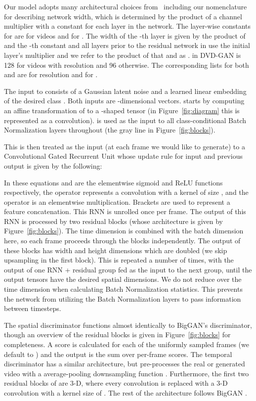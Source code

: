 \documentclass{article} \usepackage{iclr2020_conference,times}
\begin{document}
Our model adopts many architectural choices from~\citet{brock2018large} including our nomenclature for describing network width, which is determined by the product of a channel multiplier  with a constant for each layer in the network. The layer-wise constants for  are  for  videos and  for . The width of the -th layer is given by the product of  and the -th constant and all layers prior to the residual network in  use the initial layer's multiplier and we refer to the product of that and  as .  in DVD-GAN is 128 for videos with  resolution and 96 otherwise. The corresponding  lists for both  and  are  for  resolution and  for .

The input to  consists of a Gaussian latent noise  and a learned linear embedding  of the desired class . Both inputs are -dimensional vectors.  starts by computing an affine transformation of  to a -shaped tensor (in Figure~\ref{fig:diagram} this is represented as a  convolution).  is used as the input to all class-conditional Batch Normalization layers throughout  (the gray line in Figure~\ref{fig:blocks}).

This is then treated as the input (at each frame we would like to generate) to a Convolutional Gated Recurrent Unit \citep{ballas2015delving, sutskever2011generating} whose update rule for input  and previous output  is given by the following:



In these equations  and  are the elementwise sigmoid and ReLU functions respectively, the  operator represents a convolution with a kernel of size , and the  operator is an elementwise multiplication. Brackets are used to represent a feature concatenation. This RNN is unrolled once per frame. The output of this RNN is processed by two residual blocks (whose architecture is given by Figure~\ref{fig:blocks}). The time dimension is combined with the batch dimension here, so each frame proceeds through the blocks independently. The output of these blocks has width and height dimensions which are doubled (we skip upsampling in the first block). This is repeated a number of times, with the output of one RNN + residual group fed as the input to the next group, until the output tensors have the desired spatial dimensions.
We do not reduce over the time dimension when calculating Batch Normalization statistics. This prevents the network from utilizing the Batch Normalization layers to pass information between timesteps.

The spatial discriminator  functions almost identically to BigGAN's discriminator, though an overview of the residual blocks is given in Figure~\ref{fig:blocks} for completeness. A score is calculated for each of the uniformly sampled  frames (we default to  ) and the  output is the sum over per-frame scores. 
The temporal discriminator  has a similar architecture, but pre-processes the real or generated video with a  average-pooling downsampling function . Furthermore, the first two residual blocks of  are 3-D, where every convolution is replaced with a 3-D convolution with a kernel size of .
The rest of the architecture follows BigGAN \citep{brock2018large}.
\end{document}
